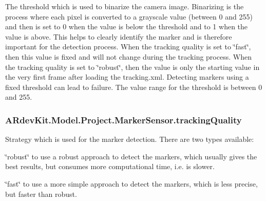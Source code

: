 The threshold which is used to binarize the camera image. Binarizing is the process where each pixel is converted to a grayscale value (between 0 and 255) and then is set to 0 when the value is below the threshold and to 1 when the value is above. This helps to clearly identify the marker and is therefore important for the detection process. When the tracking quality is set to \char`\"{}fast\char`\"{}, then this value is fixed and will not change during the tracking process. When the tracking quality is set to \char`\"{}robust\char`\"{}, then the value is only the starting value in the very first frame after loading the tracking.\-xml. Detecting markers using a fixed threshold can lead to failure. The value range for the threshold is between 0 and 255. 

\hypertarget{class_a_rdev_kit_1_1_model_1_1_project_1_1_marker_sensor_af392037ccf5a8cf5e95ce42b0c768483}{
\subsubsection[{tracking\-Quality}]{ A\-Rdev\-Kit.\-Model.\-Project.\-Marker\-Sensor.\-tracking\-Quality\hspace{0.3cm}{\ttfamily [protected]}}}\label{class_a_rdev_kit_1_1_model_1_1_project_1_1_marker_sensor_af392037ccf5a8cf5e95ce42b0c768483}


Strategy which is used for the marker detection. There are two types available\-: 


\begin{DoxyItemize}
\item \char`\"{}robust\char`\"{} to use a robust approach to detect the markers, which usually gives the best results, but consumes more computational time, i.\-e. is slower.
\item \char`\"{}fast\char`\"{} to use a more simple approach to detect the markers, which is less precise, but faster than robust. 
\end{DoxyItemize}

